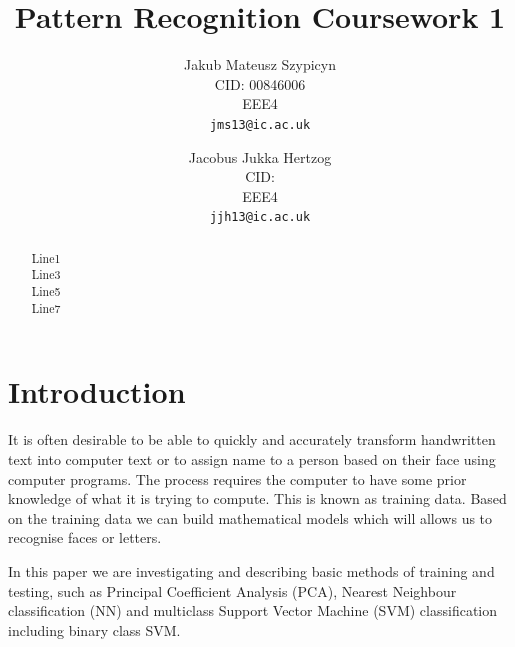 \documentclass[10pt,twocolumn,letterpaper]{article}
\begin{document}
\title{Pattern Recognition Coursework 1}

\author{Jakub Mateusz Szypicyn\\
CID: 00846006\\
EEE4\\
{\tt\small jms13@ic.ac.uk}
\and
Jacobus Jukka Hertzog\\
CID: \\
EEE4\\
{\tt\small jjh13@ic.ac.uk}
}

\maketitle

\begin{abstract}

Line1\\

Line3\\

Line5\\

Line7\\

\end{abstract}

\section{Introduction}

It is often desirable to be able to quickly and accurately transform handwritten text into computer text or to assign name to a person based on their face using computer programs. The process requires the computer to have some prior knowledge of what it is trying to compute. This is known as training data. Based on the training data we can build mathematical models which will allows us to recognise faces or letters.

In this paper we are investigating and describing basic methods of training and testing, such as Principal Coefficient Analysis (PCA), Nearest Neighbour classification (NN) and multiclass Support Vector Machine (SVM) classification including binary class SVM. 
\end{document}
